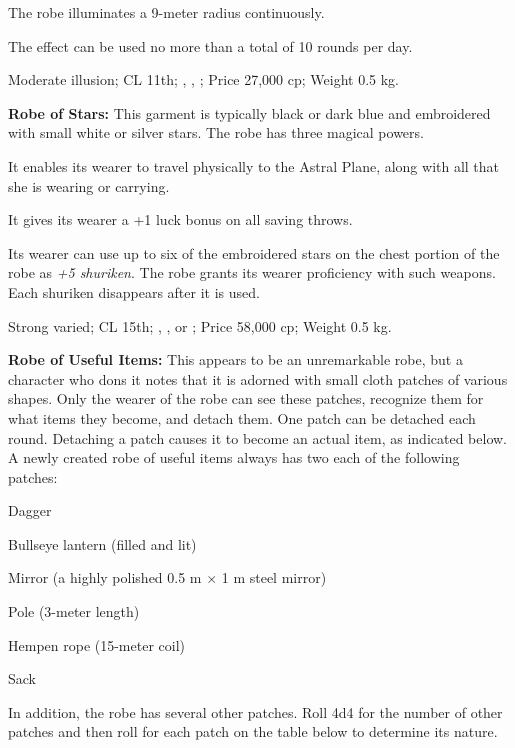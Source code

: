 The robe illuminates a 9-meter radius continuously.

The effect can be used no more than a total of 10 rounds per day.

Moderate illusion; CL 11th; , , ; Price 27,000 cp; Weight 0.5 kg.

\textbf{Robe of Stars:} This garment is typically black or dark blue and embroidered with small white or silver stars. The robe has three magical powers.

\begin{itemize*}
\item It enables its wearer to travel physically to the Astral Plane, along with all that she is wearing or carrying.
\item It gives its wearer a +1 luck bonus on all saving throws.
\item Its wearer can use up to six of the embroidered stars on the chest portion of the robe as \emph{+5 shuriken}. The robe grants its wearer proficiency with such weapons. Each shuriken disappears after it is used.
\end{itemize*}

Strong varied; CL 15th; , ,  or ; Price 58,000 cp; Weight 0.5 kg.

\textbf{Robe of Useful Items:} This appears to be an unremarkable robe, but a character who dons it notes that it is adorned with small cloth patches of various shapes. Only the wearer of the robe can see these patches, recognize them for what items they become, and detach them. One patch can be detached each round. Detaching a patch causes it to become an actual item, as indicated below. A newly created robe of useful items always has two each of the following patches:

\begin{itemize*}
\item Dagger
\item Bullseye lantern (filled and lit)
\item Mirror (a highly polished 0.5 m $\times$ 1 m steel mirror)
\item Pole (3-meter length)
\item Hempen rope (15-meter coil)
\item Sack
\end{itemize*}

In addition, the robe has several other patches. Roll 4d4 for the number of other patches and then roll for each patch on the table below to determine its nature.

